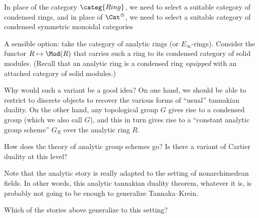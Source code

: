 \documentclass[leqno]{article}
\begin{document}
In place of the category \(\categ{Ring}\),
we need to select a suitable category of condensed rings,
and in place of \(\Cat^{\otimes}\),
we need to select a suitable category of
condensed symmetric monoidal categories

A sensible option: take the category of
analytic rings (or \(E_{\infty}\)-rings).
Consider the functor \(R \mapsto \Mod(R)\) that
carries such a ring to its condensed category
of solid modules.
(Recall that an analytic ring is a condensed ring
\emph{equipped} with an attached category of solid modules.)

Why would such a variant be a good idea?
On one hand, we should be able to restrict to discrete objects
to recover the various forms of \enquote{usual} tannakian duality.
On the other hand, any topological group \(G\)
gives rise to a condensed group
(which we also call \(G\)),
and this in turn gives rise to a
\enquote{constant analytic group scheme} \(G_R\)
over the analytic ring \(R\).

\begin{qst}
    How does the theory of analytic group schemes go?
    Is there a variant of Cartier duality at this level?
\end{qst}

Note that the analytic story is really adapted
to the setting of nonarchimedean fields.
In other words, this analytic tannakian duality theorem,
whatever it is,
is probably not going to be enough to generalize Tannaka--Krein.

\begin{qst}
    Which of the stories above generalize to this setting?
\end{qst}
\end{document}
